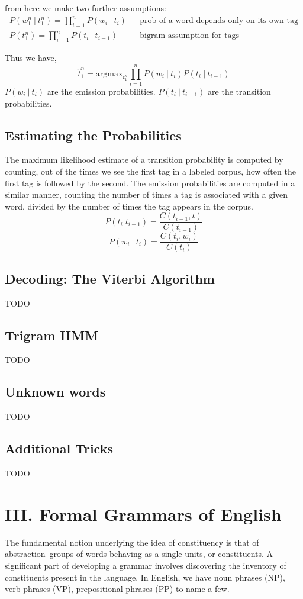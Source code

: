 \documentclass[11pt]{article}
\begin{document}
			from here we make two further assumptions:
			\begin{align*}
				P(w_1^n \ | \ t_1^n) = \prod_{i=1}^n P(w_i\ | \ t_i) && \text{prob of a word depends only on its own tag} \\
				P(t_1^n) = \prod_{i=1}^n P(t_i \ | \ t_{i-1}) && \text{bigram assumption for tags}
			\end{align*}

			Thus we have, 
			$$ \hat t_1^n = \textrm{argmax}_{t_1^n}  \prod_{i=1}^n P(w_i\ | \ t_i)P(t_i \ | \ t_{i-1})$$
			\indent $P(w_i\ | \ t_i)$ are the emission probabilities. $P(t_i \ | \ t_{i-1})$ are the transition probabilities. \\
		
		\subsection*{Estimating the Probabilities}
			The maximum likelihood estimate of a transition probability is computed by counting, out of the times we see 
			the first tag in a labeled corpus, how often the first tag is followed by the second. The emission probabilities are
			computed in a similar manner, counting the number of times a tag is associated with a given word, divided
			by the number of times the tag appears in the corpus.
			$$ P(t_i | t_{i-1}) = \frac{C(t_{i-1},t)}{C(t_{i-1})}$$
			$$ P(w_i\ | \ t_i) = \frac{C(t_i, w_i)}{C(t_i)}$$
			
		\subsection*{Decoding: The Viterbi Algorithm}
			TODO
		
		\subsection*{Trigram HMM}
			TODO
			
		\subsection*{Unknown words}
			TODO
		
		\subsection*{Additional Tricks}
			TODO
			
		\section*{III. Formal Grammars of English}
			The fundamental notion underlying the idea of constituency is that of abstraction--groups of words behaving as a 
			single units, or constituents. A significant part of developing a grammar involves discovering the inventory of 
			constituents present in the language. In English, we have noun phrases (NP), verb phrases (VP), prepositional 
			phrases (PP) to name a few. 
			
\end{document}
